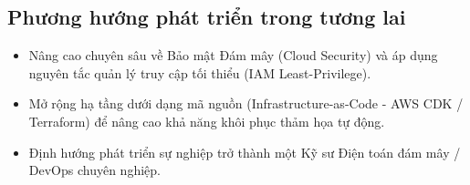 \documentclass[a4paper]{article}
\theoremstyle{definition}
\begin{document}
\subsection{Phương hướng phát triển trong tương lai}
\begin{itemize}
    \item Nâng cao chuyên sâu về Bảo mật Đám mây (Cloud Security) và áp dụng nguyên tắc quản lý truy cập tối thiểu (IAM Least-Privilege).
    \item Mở rộng hạ tầng dưới dạng mã nguồn (Infrastructure-as-Code - AWS CDK / Terraform) để nâng cao khả năng khôi phục thảm họa tự động.
    \item Định hướng phát triển sự nghiệp trở thành một Kỹ sư Điện toán đám mây / DevOps chuyên nghiệp.
\end{itemize}
\clearpage


\end{document}
